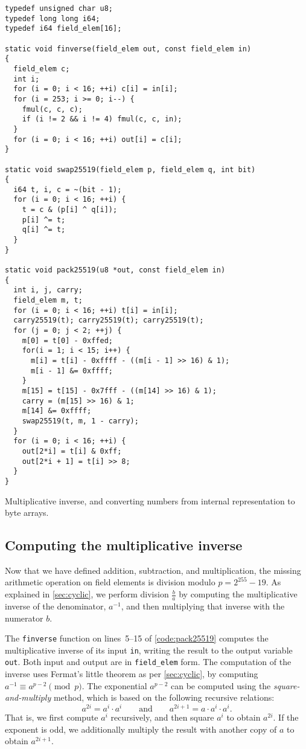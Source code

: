 \documentclass[manuscript]{acmart}
\begin{document}
\begin{listing}
\begin{verbatim}
typedef unsigned char u8;
typedef long long i64;
typedef i64 field_elem[16];

static void finverse(field_elem out, const field_elem in)
{
  field_elem c;
  int i;
  for (i = 0; i < 16; ++i) c[i] = in[i];
  for (i = 253; i >= 0; i--) {
    fmul(c, c, c);
    if (i != 2 && i != 4) fmul(c, c, in);
  }
  for (i = 0; i < 16; ++i) out[i] = c[i];
}

static void swap25519(field_elem p, field_elem q, int bit)
{
  i64 t, i, c = ~(bit - 1);
  for (i = 0; i < 16; ++i) {
    t = c & (p[i] ^ q[i]);
    p[i] ^= t;
    q[i] ^= t;
  }
}

static void pack25519(u8 *out, const field_elem in)
{
  int i, j, carry;
  field_elem m, t;
  for (i = 0; i < 16; ++i) t[i] = in[i];
  carry25519(t); carry25519(t); carry25519(t);
  for (j = 0; j < 2; ++j) {
    m[0] = t[0] - 0xffed;
    for(i = 1; i < 15; i++) {
      m[i] = t[i] - 0xffff - ((m[i - 1] >> 16) & 1);
      m[i - 1] &= 0xffff;
    }
    m[15] = t[15] - 0x7fff - ((m[14] >> 16) & 1);
    carry = (m[15] >> 16) & 1;
    m[14] &= 0xffff;
    swap25519(t, m, 1 - carry);
  }
  for (i = 0; i < 16; ++i) {
    out[2*i] = t[i] & 0xff;
    out[2*i + 1] = t[i] >> 8;
  }
}
\end{verbatim}
\caption{Multiplicative inverse, and converting numbers from internal representation to byte arrays.}\label{code:pack25519}
\end{listing}

\subsection{Computing the multiplicative inverse}\label{sec:inverse}

Now that we have defined addition, subtraction, and multiplication, the missing arithmetic operation on field elements is division modulo $p=2^{255}-19$.
As explained in \autoref{sec:cyclic}, we perform division $\frac{b}{a}$ by computing the multiplicative inverse of the denominator, $a^{-1}$, and then multiplying that inverse with the numerator $b$.

The \verb|finverse| function on lines~5--15 of \autoref{code:pack25519} computes the multiplicative inverse of its input \verb|in|, writing the result to the output variable \verb|out|.
Both input and output are in \verb|field_elem| form.
The computation of the inverse uses Fermat's little theorem as per \autoref{sec:cyclic}, by computing $a^{-1} \equiv a^{p-2} \pmod{p}$.
The exponential $a^{p-2}$ can be computed using the \emph{square-and-multiply} method, which is based on the following recursive relations:
\[ a^{2i} = a^i \cdot a^i \qquad\text{and}\qquad a^{2i+1} = a \cdot a^i \cdot a^i. \]
That is, we first compute $a^i$ recursively, and then square $a^i$ to obtain $a^{2i}$.
If the exponent is odd, we additionally multiply the result with another copy of $a$ to obtain $a^{2i+1}$.
\end{document}
